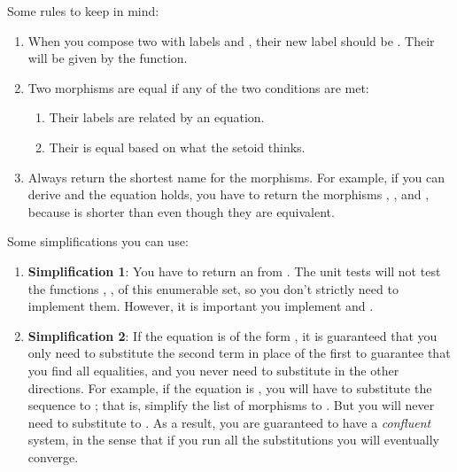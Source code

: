 Some rules to keep in mind:

\begin{enumerate}
    \item When you compose two  with labels  and , their new label should be . Their  will be given by the  function.
    \item Two morphisms are equal if any of the two conditions are met:    
    \begin{enumerate}
        \item Their labels are related by an equation.
        \item Their  is equal based on what the setoid  thinks.
    \end{enumerate}
    \item Always return the shortest name for the morphisms. For example, if you can derive  and the equation  holds, you have to return the morphisms , , and , because  is shorter than  even though they are equivalent.
\end{enumerate}

Some simplifications you can use:

\begin{enumerate}
    \item  \textbf{Simplification 1}:
        You have to return an \EnumerableSet from . The unit tests will not test the functions , ,  of this enumerable set, so you don't strictly need to implement them. However, it is important you implement  and .
    \item \textbf{Simplification 2}:
    If the equation is of the form , it is guaranteed that you only need to substitute the second term in place of the first to guarantee that you find all equalities, and you never need to substitute in the other directions.
    For example, if the equation is , you will have to substitute the sequence \pystr{[d, e]} to \pystr{[a,b,c]}; that is, simplify the list of morphisms \pystr{[a,a,b,c,a]} to \pystr{[a,d,e,a]}.  But you will never need to substitute \pystr{[a,b,c]} to \pystr{[d,e]}. 
        As a result, you are guaranteed to have a \emph{confluent} system, in the sense that if you run all the substitutions you will eventually converge. 
    
\end{enumerate}



